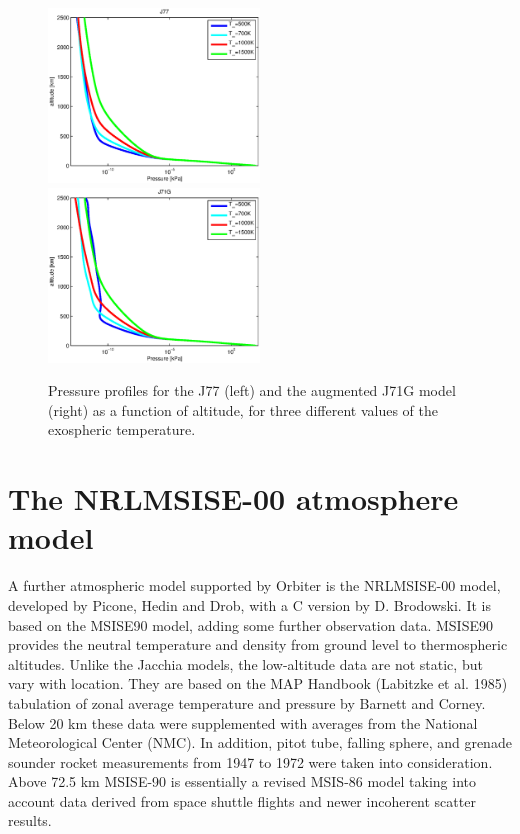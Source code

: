 \documentclass[a4paper]{article}
\begin{document}
\begin{figure}
\includegraphics[width=0.5\textwidth]{prs_j77.eps}
\includegraphics[width=0.5\textwidth]{prs_j71g.eps}
\caption{Pressure profiles for the J77 (left) and the augmented J71G model (right) as a function of altitude, for three different values of the exospheric temperature.}
\label{fig:pressure}
\end{figure}

\section{The NRLMSISE-00 atmosphere model}
A further atmospheric model supported by Orbiter is the NRLMSISE-00 model, developed by Picone, Hedin and Drob, with a C version by D. Brodowski. It is based on the MSISE90 model, adding some further observation data. MSISE90 provides the neutral temperature and density from ground level to thermospheric altitudes. Unlike the Jacchia models, the low-altitude data are not static, but vary with location. They are based on the MAP Handbook (Labitzke et al. 1985) tabulation of zonal average temperature and pressure by Barnett and Corney. Below 20 km these data were supplemented with averages from the National Meteorological Center (NMC). In addition, pitot tube, falling sphere, and grenade sounder rocket measurements from 1947 to 1972 were taken into consideration. Above 72.5 km MSISE-90 is essentially a revised MSIS-86 model taking into account data derived from space shuttle flights and newer incoherent scatter results.
\end{document}
